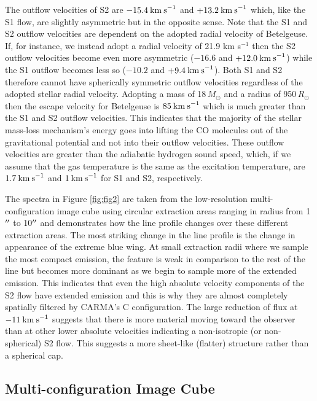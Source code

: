 \documentclass[iop]{emulateapj}
\begin{document}
The outflow velocities of S2 are $-15.4\>{\rm km\>s}^{-1}$ and $+13.2\>{\rm km\>s}^{-1}$ which, like the S1 flow, are slightly asymmetric but in the opposite sense. Note that the S1 and S2 outflow velocities are dependent on the adopted radial velocity of Betelgeuse. If, for instance, we instead adopt a radial velocity of 21.9 km s${}^{-1}$ \citep{2005A&A...430..165F} then the S2 outflow velocities become even more asymmetric ($-16.6$ and $+12.0\>{\rm km\>s}^{-1}$) while the S1 outflow becomes less so ($-10.2$ and $+9.4\>{\rm km\>s}^{-1}$). Both S1 and S2 therefore cannot have spherically symmetric outflow velocities regardless of the adopted stellar radial velocity. Adopting a mass of 18\,$M_{\odot}$ and a radius of 950\,$R_{\odot}$ \citep{2008AJ....135.1430H} then the escape velocity for Betelgeuse is $85\>{\rm km\>s}^{-1}$ which is much greater than the S1 and S2 outflow velocities. This indicates that the majority of the stellar mass-loss mechanism's energy goes into lifting the CO molecules out of the gravitational potential and not into their outflow velocities. These outflow velocities are greater than the adiabatic hydrogen sound speed, which, if we assume that the gas temperature is the same as the excitation temperature, are $1.7\>{\rm km\>s}^{-1}$ and $1\>{\rm km\>s}^{-1}$ for S1 and S2, respectively. 

The spectra in Figure \ref{fig:fig2} are taken from the low-resolution multi-configuration image cube using circular extraction areas ranging in radius from 1$\mbox{$^{\prime\prime}$}$ to 10$\mbox{$^{\prime\prime}$}$ and demonstrates how the line profile changes over these different extraction areas. The most striking change in the line profile is the change in appearance of the extreme blue wing. At small extraction radii where we sample the most compact emission, the feature is weak in comparison to the rest of the line but becomes more dominant as we begin to sample more of the extended emission. This indicates that even the high absolute velocity components of the S2 flow have extended emission and this is why they are almost completely spatially filtered by CARMA's C configuration. The large reduction of flux at $-11\>{\rm km\>s}^{-1}$ suggests that there is more material moving toward the observer than at other lower absolute velocities indicating a non-isotropic (or non-spherical) S2 flow. This suggests a more sheet-like (flatter) structure rather than a spherical cap.

\subsection{Multi-configuration Image Cube} \label{results2} 
\end{document}
